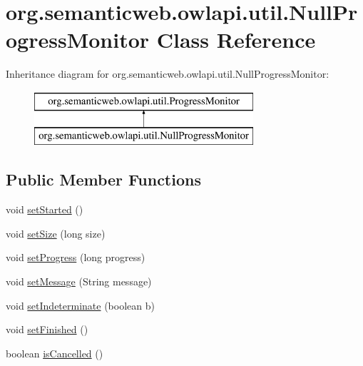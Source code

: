 \hypertarget{classorg_1_1semanticweb_1_1owlapi_1_1util_1_1_null_progress_monitor}{\section{org.\-semanticweb.\-owlapi.\-util.\-Null\-Progress\-Monitor Class Reference}
\label{classorg_1_1semanticweb_1_1owlapi_1_1util_1_1_null_progress_monitor}
}
Inheritance diagram for org.\-semanticweb.\-owlapi.\-util.\-Null\-Progress\-Monitor\-:\begin{figure}[H]
\begin{center}
\leavevmode
\includegraphics[height=2.000000cm]{classorg_1_1semanticweb_1_1owlapi_1_1util_1_1_null_progress_monitor}
\end{center}
\end{figure}
\subsection*{Public Member Functions}
\begin{DoxyCompactItemize}
\item 
void \hyperlink{classorg_1_1semanticweb_1_1owlapi_1_1util_1_1_null_progress_monitor_a45e71f1ab06f6c1ad03912fc9de603ff}{set\-Started} ()
\item 
void \hyperlink{classorg_1_1semanticweb_1_1owlapi_1_1util_1_1_null_progress_monitor_a5fe44b70546623f1cf78ca73cfce3e44}{set\-Size} (long size)
\item 
void \hyperlink{classorg_1_1semanticweb_1_1owlapi_1_1util_1_1_null_progress_monitor_adda0b80033f0b1c7b5c265136ecb4dcd}{set\-Progress} (long progress)
\item 
void \hyperlink{classorg_1_1semanticweb_1_1owlapi_1_1util_1_1_null_progress_monitor_acc6aca9023430dafe51a9f0ebf9c0143}{set\-Message} (String message)
\item 
void \hyperlink{classorg_1_1semanticweb_1_1owlapi_1_1util_1_1_null_progress_monitor_a43dbba887def8c133b09a140a5db82a4}{set\-Indeterminate} (boolean b)
\item 
void \hyperlink{classorg_1_1semanticweb_1_1owlapi_1_1util_1_1_null_progress_monitor_a25c8c6be9a3d836a5c46ce40366635ac}{set\-Finished} ()
\item 
boolean \hyperlink{classorg_1_1semanticweb_1_1owlapi_1_1util_1_1_null_progress_monitor_af66974ad71778a6811a9c4a5c40816cb}{is\-Cancelled} ()
\end{DoxyCompactItemize}


